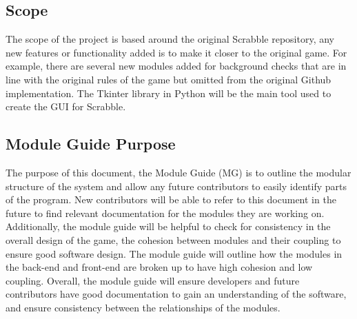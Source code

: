 \documentclass[12pt, titlepage]{article}
\begin{document}
\subsection{Scope}

The scope of the project is based around the original Scrabble repository, any new features or functionality added is to make it closer to the original game. For example, there are several new modules added for background checks that are in line with the original rules of the game but omitted from the original Github implementation. The Tkinter library in Python will be the main tool used to create the GUI for Scrabble.

\subsection{Module Guide Purpose}
The purpose of this document, the Module Guide (MG) is to outline the modular structure of the system and allow any future contributors to easily identify parts of the program. New contributors will be able to refer to this document in the future to find relevant documentation for the modules they are working on. Additionally, the module guide will be helpful to check for consistency in the overall design of the game, the cohesion between modules and their coupling to ensure good software design. The module guide will outline how the modules in the back-end and front-end are broken up to have high cohesion and low coupling. Overall, the module guide will ensure developers and future contributors have good documentation to gain an understanding of the software, and ensure consistency between the relationships of the modules.


\end{document}
